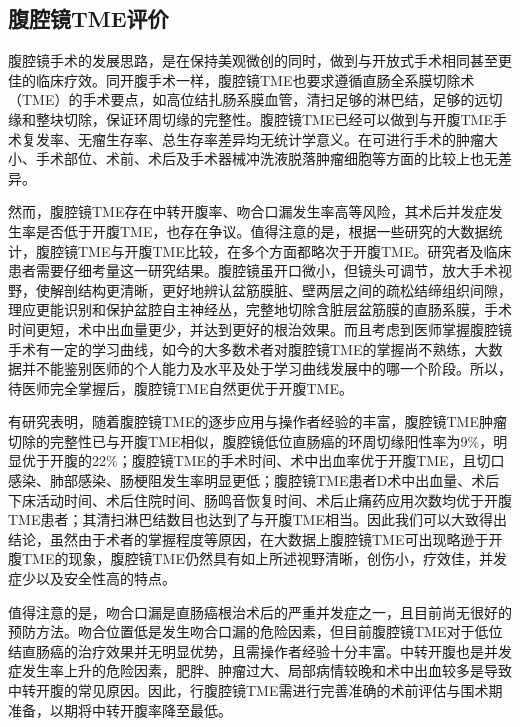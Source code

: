 \documentclass[a4paper,11pt,onecolumn,twoside]{article}
\begin{document}
\begin{multicols}{2}
    \subsection{腹腔镜TME评价}
    腹腔镜手术的发展思路，是在保持美观微创的同时，做到与开放式手术相同甚至更佳的临床疗效。同开腹手术一样，腹腔镜TME也要求遵循直肠全系膜切除术（TME）的手术要点，如高位结扎肠系膜血管，清扫足够的淋巴结，足够的远切缘和整块切除，保证环周切缘的完整性。\supercite{W4}腹腔镜TME已经可以做到与开腹TME手术复发率、无瘤生存率、总生存率差异均无统计学意义\supercite{W5}。在可进行手术的肿瘤大小、手术部位、术前、术后及手术器械冲洗液脱落肿瘤细胞等方面的比较上也无差异\supercite{16}。

    然而，腹腔镜TME存在中转开腹率、吻合口漏发生率高等风险，其术后并发症发生率是否低于开腹TME，也存在争议。值得注意的是，根据一些研究的大数据统计，腹腔镜TME与开腹TME比较，在多个方面都略次于开腹TME\supercite{17}。研究者及临床患者需要仔细考量这一研究结果。腹腔镜虽开口微小，但镜头可调节，放大手术视野，使解剖结构更清晰，更好地辨认盆筋膜脏、壁两层之间的疏松结缔组织间隙，理应更能识别和保护盆腔自主神经丛，完整地切除含脏层盆筋膜的直肠系膜，手术时间更短，术中出血量更少，并达到更好的根治效果。而且考虑到医师掌握腹腔镜手术有一定的学习曲线，如今的大多数术者对腹腔镜TME的掌握尚不熟练，大数据并不能鉴别医师的个人能力及水平及处于学习曲线发展中的哪一个阶段。所以，待医师完全掌握后，腹腔镜TME自然更优于开腹TME。

    有研究表明，随着腹腔镜TME的逐步应用与操作者经验的丰富，腹腔镜TME肿瘤切除的完整性已与开腹TME相似，腹腔镜低位直肠癌的环周切缘阳性率为9\%，明显优于开腹的22\%；腹腔镜TME的手术时间、术中出血率优于开腹TME，且切口感染、肺部感染、肠梗阻发生率明显更低\supercite{2,18}；腹腔镜TME患者D术中出血量、术后下床活动时间、术后住院时间、肠鸣音恢复时间、术后止痛药应用次数均优于开腹TME患者\supercite{19,20}；其清扫淋巴结数目也达到了与开腹TME相当\supercite{W3}。因此我们可以大致得出结论，虽然由于术者的掌握程度等原因，在大数据上腹腔镜TME可出现略逊于开腹TME的现象，腹腔镜TME仍然具有如上所述视野清晰，创伤小，疗效佳，并发症少以及安全性高的特点。

    值得注意的是，吻合口漏是直肠癌根治术后的严重并发症之一，且目前尚无很好的预防方法。吻合位置低是发生吻合口漏的危险因素，但目前腹腔镜TME对于低位结直肠癌的治疗效果并无明显优势，且需操作者经验十分丰富\supercite{W6}。中转开腹也是并发症发生率上升的危险因素，肥胖、肿瘤过大、局部病情较晚和术中出血较多是导致中转开腹的常见原因\supercite{W4}。因此，行腹腔镜TME需进行完善准确的术前评估与围术期准备，以期将中转开腹率降至最低。

\end{multicols}
\end{document}
